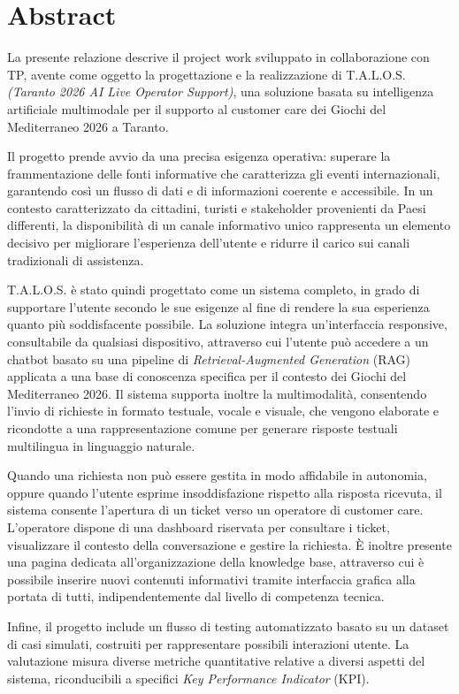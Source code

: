 \chapter*{Abstract}

La presente relazione descrive il project work sviluppato in collaborazione con TP, avente come oggetto la progettazione e la realizzazione di T.A.L.O.S. \textit{(Taranto 2026 AI Live Operator Support)}, una soluzione basata su intelligenza artificiale multimodale per il supporto al customer care dei Giochi del Mediterraneo 2026 a Taranto.

Il progetto prende avvio da una precisa esigenza operativa: superare la frammentazione delle fonti informative che caratterizza gli eventi internazionali, garantendo così un flusso di dati e di informazioni coerente e accessibile. In un contesto caratterizzato da cittadini, turisti e stakeholder provenienti da Paesi differenti, la disponibilità di un canale informativo unico rappresenta un elemento decisivo per migliorare l’esperienza dell’utente e ridurre il carico sui canali tradizionali di assistenza.

T.A.L.O.S. è stato quindi progettato come un sistema completo, in grado di supportare l’utente secondo le sue esigenze al fine di rendere la sua esperienza quanto più soddisfacente possibile. La soluzione integra un’interfaccia responsive, consultabile da qualsiasi dispositivo, attraverso cui l’utente può accedere a un chatbot basato su una pipeline di \textit{Retrieval-Augmented Generation} (RAG) applicata a una base di conoscenza specifica per il contesto dei Giochi del Mediterraneo 2026. Il sistema supporta inoltre la multimodalità, consentendo l’invio di richieste in formato testuale, vocale e visuale, che vengono elaborate e ricondotte a una rappresentazione comune per generare risposte testuali multilingua in linguaggio naturale.

Quando una richiesta non può essere gestita in modo affidabile in autonomia, oppure quando l’utente esprime insoddisfazione rispetto alla risposta ricevuta, il sistema consente l’apertura di un ticket verso un operatore di customer care. L’operatore dispone di una dashboard riservata per consultare i ticket, visualizzare il contesto della conversazione e gestire la richiesta. È inoltre presente una pagina dedicata all'organizzazione della knowledge base, attraverso cui è possibile inserire nuovi contenuti informativi tramite interfaccia grafica alla portata di tutti, indipendentemente dal livello di competenza tecnica.

Infine, il progetto include un flusso di testing automatizzato basato su un dataset di casi simulati, costruiti per rappresentare possibili interazioni utente. La valutazione misura diverse metriche quantitative relative a diversi aspetti del sistema, riconducibili a specifici \textit{Key Performance Indicator} (KPI).